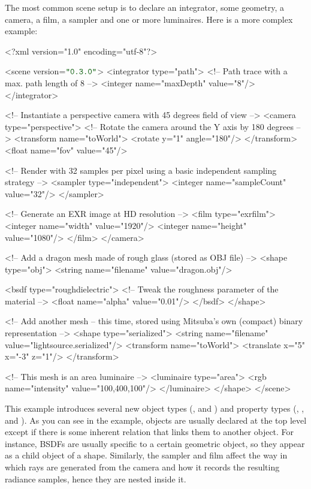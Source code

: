 The most common scene setup is to declare an integrator, some geometry, a camera, a film, a sampler  
and one or more luminaires. Here is a more complex example:
\begin{xml}
<?xml version="1.0" encoding="utf-8"?>

<scene version=$\MtsVer$>
	<integrator type="path">
		<!-- Path trace with a max. path length of 8 -->
		<integer name="maxDepth" value="8"/>
	</integrator>

	<!-- Instantiate a perspective camera with 45 degrees field of view -->
	<camera type="perspective">
		<!-- Rotate the camera around the Y axis by 180 degrees -->
		<transform name="toWorld">
			<rotate y="1" angle="180"/>
		</transform>
		<float name="fov" value="45"/>

		<!-- Render with 32 samples per pixel using a basic
             independent sampling strategy -->
		<sampler type="independent">
			<integer name="sampleCount" value="32"/>
		</sampler>

		<!-- Generate an EXR image at HD resolution -->
		<film type="exrfilm">
			<integer name="width" value="1920"/>
			<integer name="height" value="1080"/>
		</film>
	</camera>

	<!-- Add a dragon mesh made of rough glass (stored as OBJ file) -->
	<shape type="obj">
		<string name="filename" value="dragon.obj"/>

		<bsdf type="roughdielectric">
			<!-- Tweak the roughness parameter of the material -->
			<float name="alpha" value="0.01"/>
		</bsdf>
	</shape>

	<!-- Add another mesh -- this time, stored using Mitsuba's own
	     (compact) binary representation -->
	<shape type="serialized">
		<string name="filename" value="lightsource.serialized"/>
		<transform name="toWorld">
			<translate x="5" x="-3" z="1"/>
		</transform>

		<!-- This mesh is an area luminaire -->
		<luminaire type="area">
			<rgb name="intensity" value="100,400,100"/>
		</luminaire>
	</shape>
</scene>
\end{xml}
This example introduces several new object types (, and )
and property types (, , and ). 
As you can see in the example, objects are usually declared at the top level except if there is some
inherent relation that links them to another object. For instance, BSDFs are usually specific to a certain geometric object, so 
they appear as a child object of a shape. Similarly, the sampler and film affect the way in which
rays are generated from the camera and how it records the resulting radiance samples, hence they are nested inside it.

